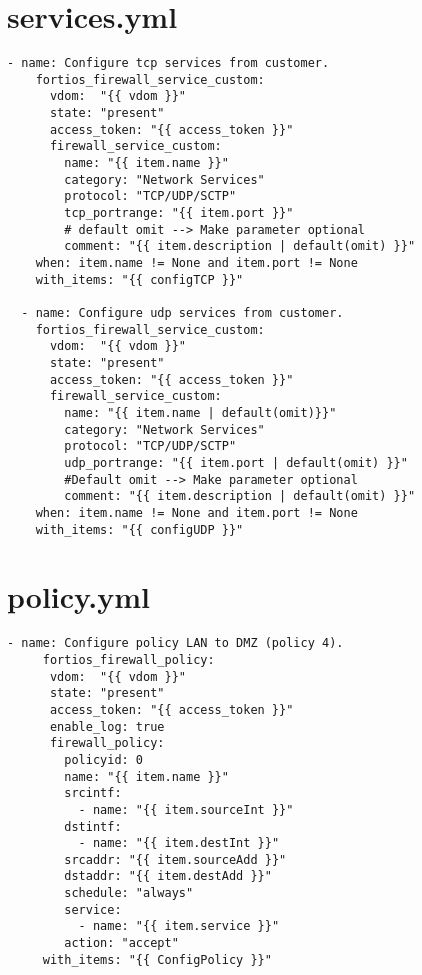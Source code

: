 \documentclass[dutch,dit,thesis]{hogentreport}
\begin{document}
\section{services.yml}
\label{code:services.yml}
\begin{lstlisting}[caption={services.yml}]
  - name: Configure tcp services from customer.
    fortios_firewall_service_custom:
      vdom:  "{{ vdom }}"
      state: "present"
      access_token: "{{ access_token }}"
      firewall_service_custom:
        name: "{{ item.name }}"
        category: "Network Services"
        protocol: "TCP/UDP/SCTP"
        tcp_portrange: "{{ item.port }}" 
        # default omit --> Make parameter optional
        comment: "{{ item.description | default(omit) }}"
    when: item.name != None and item.port != None
    with_items: "{{ configTCP }}"
  
  - name: Configure udp services from customer.
    fortios_firewall_service_custom:
      vdom:  "{{ vdom }}"
      state: "present"
      access_token: "{{ access_token }}"
      firewall_service_custom:
        name: "{{ item.name | default(omit)}}"
        category: "Network Services"
        protocol: "TCP/UDP/SCTP"
        udp_portrange: "{{ item.port | default(omit) }}" 
        #Default omit --> Make parameter optional
        comment: "{{ item.description | default(omit) }}"
    when: item.name != None and item.port != None
    with_items: "{{ configUDP }}"

\end{lstlisting}

\section{policy.yml}
\label{code:policy.yml}

\begin{lstlisting}[caption={policy.yml}]
   - name: Configure policy LAN to DMZ (policy 4).
     fortios_firewall_policy:
      vdom:  "{{ vdom }}"
      state: "present"
      access_token: "{{ access_token }}"
      enable_log: true
      firewall_policy:
        policyid: 0
        name: "{{ item.name }}" 
        srcintf: 
          - name: "{{ item.sourceInt }}" 
        dstintf:
          - name: "{{ item.destInt }}"
        srcaddr: "{{ item.sourceAdd }}" 
        dstaddr: "{{ item.destAdd }}"
        schedule: "always"
        service:
          - name: "{{ item.service }}"
        action: "accept"
     with_items: "{{ ConfigPolicy }}"
\end{lstlisting}
\end{document}
